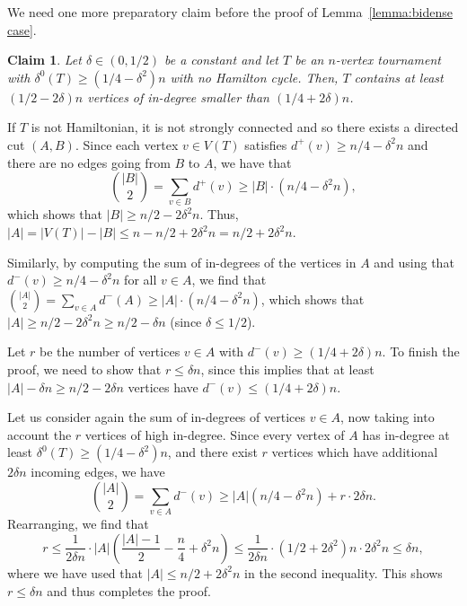 \documentclass[a4paper,11pt]{article}
\makeatletter
\renewenvironment{proof}[1][\proofname] {\par\pushQED{\qed}\normalfont\topsep6\p@\@plus6\p@\relax\trivlist\item[\hskip\labelsep\textit{#1}\@addpunct{.}]\ignorespaces}{\popQED\endtrivlist\@endpefalse}
\newtheorem{claim}[theorem]{\bf Claim}
\theoremstyle{definition}
\makeatother
\begin{document}
We need one more preparatory claim before the proof of Lemma~\ref{lemma:bidense case}. %

\begin{claim}\label{claim:stability}
Let $\delta\in (0, 1/2)$ be a constant and let $T$ be an $n$-vertex tournament with $\delta^0(T)\geq (1/4-\delta^2)n$ with no Hamilton cycle. Then, $T$ contains at least $(1/2-2\delta) n$ vertices of in-degree smaller than $(1/4+2\delta)n$. 
\end{claim}
\begin{proof}
If $T$ is not Hamiltonian, it is not strongly connected and so there exists a directed cut $(A, B)$. Since each vertex $v\in V(T)$ satisfies $d^+(v)\geq n/4-\delta^2 n$ and there are no edges going from $B$ to $A$, we have that 
\[\binom{|B|}{2}=\sum_{v\in B}d^+(v)\geq |B|\cdot (n/4-\delta^2 n),\]
which shows that $|B|\geq n/2-2\delta^2 n$. Thus, $|A|=|V(T)|-|B|\leq n-n/2+2\delta^2 n=n/2+2\delta^2 n$. 

Similarly, by computing the sum of in-degrees of the vertices in $A$ and using that $d^-(v)\geq n/4-\delta^2 n$ for all $v\in A$, we find that $\binom{|A|}{2}=\sum_{v\in A}d^-(A)\geq |A|\cdot (n/4-\delta^2 n)$, which shows that $|A|\geq n/2-2\delta^2 n\geq n/2-\delta n$ (since $\delta\leq 1/2$).%

Let $r$ be the number of vertices $v\in A$ with $d^-(v)\geq (1/4+2\delta) n$. To finish the proof, we need to show that $r\leq \delta n$, since this implies that at least $|A|-\delta n\geq n/2-2\delta n$ vertices have $d^-(v)\leq (1/4+2\delta) n$. 

Let us consider again the sum of in-degrees of vertices $v\in A$, now taking into account the $r$ vertices of high in-degree. %
Since every vertex of $A$ has in-degree at least $\delta^0(T)\geq (1/4-\delta^2)n$, and there exist $r$ vertices which have additional $2\delta n$ incoming edges, we have
\[\binom{|A|}{2} = \sum_{v\in A}d^-(v)\geq |A| (n/4-\delta^2 n) + r\cdot 2\delta n.\]
Rearranging, we find that 
\[r\leq \frac{1}{2\delta n}\cdot |A|\left(\frac{|A|-1}{2}-\frac{n}{4}+\delta^2 n\right) \leq \frac{1}{2\delta n}\cdot (1/2+2\delta^2) n \cdot 2\delta^2 n  \leq \delta n,\]
where we have used that $|A|\leq n/2+2\delta^2 n$ in the second inequality. This shows $r\leq \delta n$ and thus completes the proof.
\end{proof}
\end{document}
